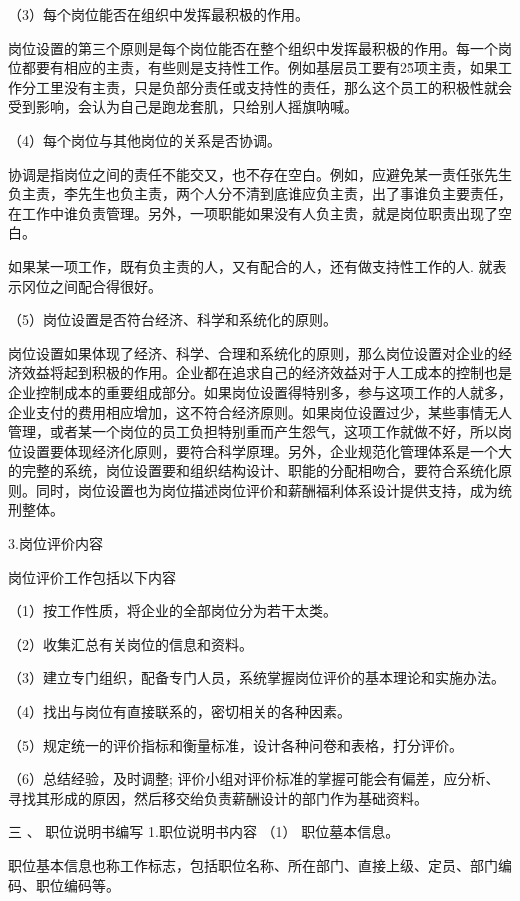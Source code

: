 \documentclass[CJK]{z-article}
\begin{document}
    （3）每个岗位能否在组织中发挥最积极的作用。

    岗位设置的第三个原则是每个岗位能否在整个组织中发挥最积极的作用。每一个岗位都要有相应的主责，有些则是支持性工作。例如基层员工要有2\~5项主责，如果工作分工里没有主责，只是负部分责任或支持性的责任，那么这个员工的积极性就会受到影响，会认为自己是跑龙套肌，只给别人摇旗呐喊。

    （4）每个岗位与其他岗位的关系是否协调。

    协调是指岗位之间的责任不能交又，也不存在空白。例如，应避免某一责任张先生负主责，李先生也负主责，两个人分不清到底谁应负主责，出了事谁负主要责任，在工作中谁负责管理。另外，一项职能如果没有人负主贵，就是岗位职责出现了空白。

    如果某一项工作，既有负主责的人，又有配合的人，还有做支持性工作的人. 就表示冈位之间配合得很好。

    （5）岗位设置是否符台经济、科学和系统化的原则。

    岗位设置如果体现了经济、科学、合理和系统化的原则，那么岗位设置对企业的经济效益将起到积极的作用。企业都在追求自己的经济效益对于人工成本的控制也是企业控制成本的重要组成部分。如果岗位设置得特别多，参与这项工作的人就多，企业支付的费用相应增加，这不符合经济原则。如果岗位设置过少，某些事情无人管理，或者某一个岗位的员工负担特别重而产生怨气，这项工作就做不好，所以岗位设置要体现经济化原则，要符合科学原理。另外，企业规范化管理体系是一个大的完整的系统，岗位设置要和组织结构设计、职能的分配相吻合，要符合系统化原则。同时，岗位设置也为岗位描述岗位评价和薪酬福利体系设计提供支持，成为统刑整体。

    3.岗位评价内容

    岗位评价工作包括以下内容

    （1）按工作性质，将企业的全部岗位分为若干太类。

    （2）收集汇总有关岗位的信息和资料。

    （3）建立专门组织，配备专门人员，系统掌握岗位评价的基本理论和实施办法。

    （4）找出与岗位有直接联系的，密切相关的各种因素。

    （5）规定统一的评价指标和衡量标准，设计各种问卷和表格，打分评价。

    （6）总结经验，及时调整; 评价小组对评价标准的掌握可能会有偏差，应分析、寻找其形成的原因，然后移交绐负责薪酬设计的部门作为基础资料。

    三 、 职位说明书编写
    1.职位说明书内容
    （1） 职位墓本信息。

    职位基本信息也称工作标志，包括职位名称、所在部门、直接上级、定员、部门编码、职位编码等。
\end{document}
